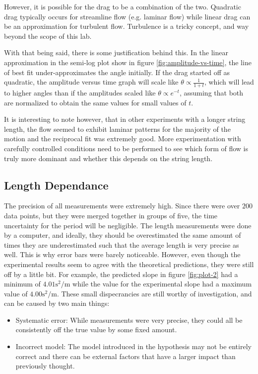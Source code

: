 \documentclass[%
 reprint,
 amsmath,amssymb
 aps,
]{revtex4-2}
\begin{document}
However, it is possible for the drag to be a combination of the two. Quadratic drag typically occurs for streamline flow (e.g. laminar flow) while linear drag can be an approximation for turbulent flow. Turbulence is a tricky concept, and way beyond the scope of this lab.

With that being said, there is some justification behind this. In the linear approximation in the semi-log plot show in figure \ref{fig:amplitude-vs-time}, the line of best fit under-approximates the angle initially. If the drag started off as quadratic, the amplitude versus time graph will scale like $\theta \propto \frac{1}{1+t}$, which will lead to higher angles than if the amplitudes scaled like $\theta \propto e^{-t}$, assuming that both are normalized to obtain the same values for small values of $t$.

It is interesting to note however, that in other experiments with a longer string length, the flow seemed to exhibit laminar patterns for the majority of the motion and the reciprocal fit was extremely good. More experimentation with carefully controlled conditions need to be performed to see which form of flow is truly more dominant and whether this depends on the string length. 
\subsection{Length Dependance}
The precision of all measurements were extremely high. Since there were over $200$ data points, but they were merged together in groups of five, the time uncertainty for the period will be negligible. The length measurements were done by a computer, and ideally, they should be overestimated the same amount of times they are underestimated such that the average length is very precise as well. This is why error bars were barely noticeable. However, even though the experimental results seem to agree with the theoretical predictions, they were still off by a little bit. For example, the predicted slope in figure \ref{fig:plot-2} had a minimum of $4.01\si{\second\squared\per\meter}$ while the value for the experimental slope had a maximum value of $4.00\si{\second\squared\per\meter}$. These small dispecrancies are still worthy of investigation, and can be caused by two main things:
\begin{itemize}
    \item Systematic error: While measurements were very precise, they could all be consistently off the true value by some fixed amount.
    \item Incorrect model: The model introduced in the hypothesis may not be entirely correct and there can be external factors that have a larger impact than previously thought.
\end{itemize}
\end{document}
